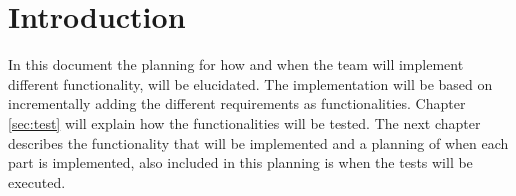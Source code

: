 \chapter{Introduction}
In this document the planning for how and when the team will implement different functionality, will be elucidated. The implementation will be based on incrementally adding the different requirements as functionalities. Chapter \ref{sec:test} will explain how the functionalities will be tested. The next chapter describes the functionality that will be implemented and a planning of when each part is implemented, also included in this planning is when the tests will be executed.